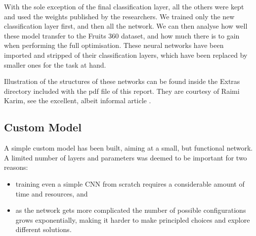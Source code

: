 

With the sole exception of the final classification layer, all the others were kept and used the weights published by the researchers. We trained only the new classification layer first, and then all the network. We can then analyse how well these model transfer to the Fruits 360 dataset, and how much there is to gain when performing the full optimisation.
These neural networks have been imported and stripped of their classification layers, which have been replaced by smaller ones for the task at hand.

Illustration of the structures of these networks can be found inside the Extras directory included with the pdf file of this report. They are courtesy of Raimi Karim, see the excellent, albeit informal article \cite{IllustratedCNN}.

\subsection{Custom Model}
A simple custom model has been built, aiming at a small, but functional network. A limited number of layers and parameters was deemed to be important for two reasons:
\begin{itemize}
	\item training even a simple CNN from scratch requires a considerable amount of time and resources, and
	\item as the network gets more complicated the number of possible configurations grows exponentially, making it harder to make principled choices and explore different solutions.
\end{itemize}

